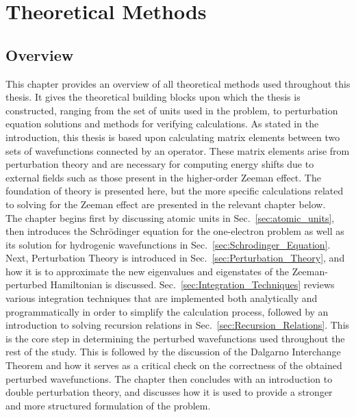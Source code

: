 
\chapter{Theoretical Methods} \label{Theoretical_Methods}

\section{Overview}
        This chapter provides an overview of all theoretical methods used throughout this thesis. It gives the theoretical building blocks upon which the thesis is constructed, ranging from the set of units used in the problem, to perturbation equation solutions and methods for verifying calculations. As stated in the introduction, this thesis is based upon calculating matrix elements between two sets of wavefunctions connected by an operator. These matrix elements arise from perturbation theory and are necessary for computing energy shifts due to external fields such as those present in the higher-order Zeeman effect. The foundation of theory is presented here, but the more specific calculations related to solving for the Zeeman effect are presented in the relevant chapter below.\\

        The chapter begins first by discussing atomic units in Sec.~\ref{sec:atomic_units}, then introduces the Schrödinger equation for the one-electron problem as well as its solution for hydrogenic wavefunctions in Sec.~\ref{sec:Schrodinger_Equation}. Next, Perturbation Theory is introduced in Sec.~\ref{sec:Perturbation_Theory}, and how it is to approximate the new eigenvalues and eigenstates of the Zeeman-perturbed Hamiltonian is discussed. Sec.~\ref{sec:Integration_Techniques} reviews various integration techniques that are implemented both analytically and programmatically in order to simplify the calculation process, followed by an introduction to solving recursion relations in Sec.~\ref{sec:Recursion_Relations}. This is the core step in determining the perturbed wavefunctions used throughout the rest of the study. This is followed by the discussion of the Dalgarno Interchange Theorem and how it serves as a critical check on the correctness of the obtained perturbed wavefunctions. The chapter then concludes with an introduction to double perturbation theory, and discusses how it is used to provide a stronger and more structured formulation of the problem.

